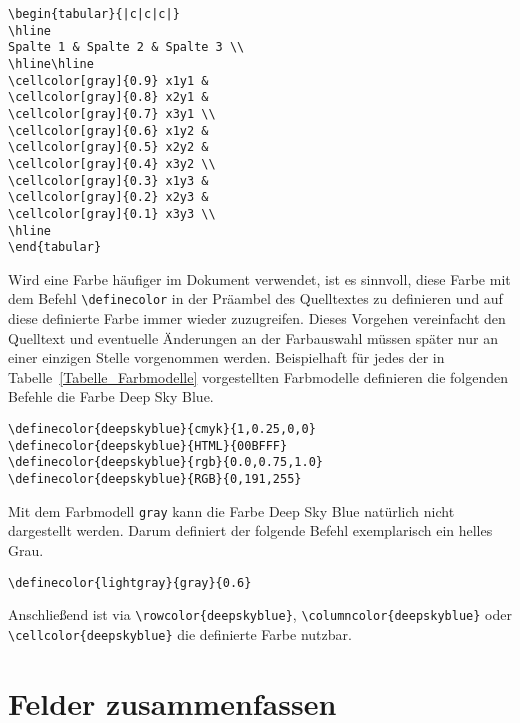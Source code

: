 \begin{lstlisting}[caption={Das Einfärben einzelner Tabellenfelder (Zellen) ermöglicht der Befehl \texttt{cellcolor}},label=tabularfarbe3, style=customlatex]
\begin{tabular}{|c|c|c|}
\hline
Spalte 1 & Spalte 2 & Spalte 3 \\
\hline\hline
\cellcolor[gray]{0.9} x1y1 & 
\cellcolor[gray]{0.8} x2y1 & 
\cellcolor[gray]{0.7} x3y1 \\
\cellcolor[gray]{0.6} x1y2 & 
\cellcolor[gray]{0.5} x2y2 & 
\cellcolor[gray]{0.4} x3y2 \\
\cellcolor[gray]{0.3} x1y3 & 
\cellcolor[gray]{0.2} x2y3 & 
\cellcolor[gray]{0.1} x3y3 \\
\hline
\end{tabular}
\end{lstlisting}

Wird eine Farbe häufiger im Dokument verwendet, ist es sinnvoll, diese Farbe mit dem 
Befehl \verb!\definecolor! in der Präambel des Quelltextes zu definieren und auf diese definierte Farbe immer wieder zuzugreifen. Dieses Vorgehen vereinfacht den Quelltext und eventuelle Änderungen an der Farbauswahl müssen später nur an einer einzigen Stelle vorgenommen werden. Beispielhaft für jedes der in Tabelle~\ref{Tabelle_Farbmodelle} vorgestellten Farbmodelle definieren die folgenden Befehle die Farbe Deep Sky Blue.


\begin{Verbatim}[frame=single]
\definecolor{deepskyblue}{cmyk}{1,0.25,0,0}
\definecolor{deepskyblue}{HTML}{00BFFF}
\definecolor{deepskyblue}{rgb}{0.0,0.75,1.0}
\definecolor{deepskyblue}{RGB}{0,191,255}
\end{Verbatim}



Mit dem Farbmodell \verb!gray! kann die Farbe Deep Sky Blue natürlich nicht dargestellt werden. Darum definiert der folgende Befehl exemplarisch ein helles Grau.

\begin{Verbatim}[frame=single]
\definecolor{lightgray}{gray}{0.6}
\end{Verbatim}

Anschließend ist via \verb!\rowcolor{deepskyblue}!, \verb!\columncolor{deepskyblue}! oder \verb!\cellcolor{deepskyblue}! die definierte Farbe nutzbar.



\section{Felder zusammenfassen}

